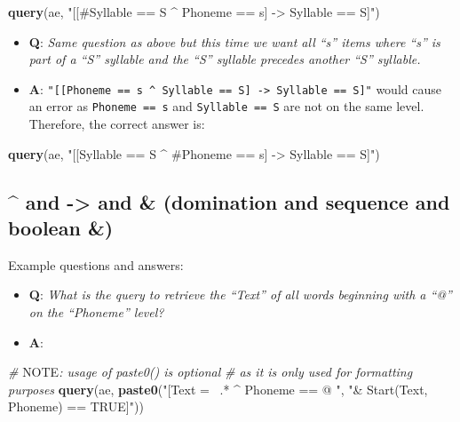 \documentclass[]{book}
\newenvironment{Shaded}{\begin{snugshade}}{\end{snugshade}}
\newcommand{\AlertTok}[1]{\textcolor[rgb]{0.94,0.16,0.16}{#1}}
\newcommand{\CommentTok}[1]{\textcolor[rgb]{0.56,0.35,0.01}{\textit{#1}}}
\newcommand{\KeywordTok}[1]{\textcolor[rgb]{0.13,0.29,0.53}{\textbf{#1}}}
\newcommand{\NormalTok}[1]{#1}
\newcommand{\StringTok}[1]{\textcolor[rgb]{0.31,0.60,0.02}{#1}}
\providecommand{\tightlist}{%
  \setlength{\itemsep}{0pt}\setlength{\parskip}{0pt}}
\begin{document}
\begin{Shaded}
\begin{Highlighting}[]
\KeywordTok{query}\NormalTok{(ae, }\StringTok{"[[#Syllable == S ^ Phoneme == s] -> Syllable == S]"}\NormalTok{)}
\end{Highlighting}
\end{Shaded}

\begin{itemize}
\tightlist
\item
  \textbf{Q}: \emph{Same question as above but this time we want all ``s'' items where ``s'' is part of a ``S'' syllable and the ``S'' syllable precedes another ``S'' syllable.}
\item
  \textbf{A}:
  \texttt{"{[}{[}Phoneme\ ==\ s\ \^{}\ Syllable\ ==\ S{]}\ -\textgreater{}\ Syllable\ ==\ S{]}"} would cause an error as \texttt{Phoneme\ ==\ s} and \texttt{Syllable\ ==\ S} are not on the same level. Therefore, the correct answer is:
\end{itemize}

\begin{Shaded}
\begin{Highlighting}[]
\KeywordTok{query}\NormalTok{(ae, }\StringTok{"[[Syllable == S ^ #Phoneme == s] -> Syllable == S]"}\NormalTok{)}
\end{Highlighting}
\end{Shaded}

\hypertarget{and---and-domination-and-sequence-and-boolean}{%
\subsection{\^{} and -\textgreater{} and \& (domination and sequence and boolean \&)}\label{and---and-domination-and-sequence-and-boolean}}

Example questions and answers:

\begin{itemize}
\tightlist
\item
  \textbf{Q}: \emph{What is the query to retrieve the ``Text'' of all words beginning with a ``@'' on the ``Phoneme'' level?}
\item
  \textbf{A}:
\end{itemize}

\begin{Shaded}
\begin{Highlighting}[]
\CommentTok{# }\AlertTok{NOTE}\CommentTok{: usage of paste0() is optional}
\CommentTok{# as it is only used for formatting purposes}
\KeywordTok{query}\NormalTok{(ae, }\KeywordTok{paste0}\NormalTok{(}\StringTok{"[Text =~ .* ^ Phoneme == @ "}\NormalTok{,}
                 \StringTok{"& Start(Text, Phoneme) == TRUE]"}\NormalTok{))}
\end{Highlighting}
\end{Shaded}
\end{document}
